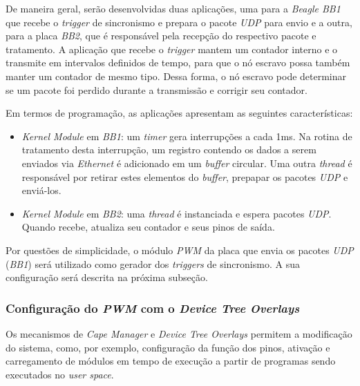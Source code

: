 De maneira geral, serão desenvolvidas duas aplicações, uma para a \textit{Beagle
BB1} que recebe o \textit{trigger} de sincronismo e prepara o pacote
\textit{UDP} para envio e a outra, para a placa \textit{BB2}, que é responsável
pela recepção do respectivo pacote e tratamento. A aplicação que recebe o
\textit{trigger} mantem um contador interno e o transmite em intervalos
definidos de tempo, para que o nó escravo possa também manter um contador
de mesmo tipo. Dessa forma, o nó escravo pode determinar se um pacote foi
perdido durante a transmissão e corrigir seu contador.

\vspace{12pt}

Em termos de programação, as aplicações apresentam as seguintes características:

\begin{itemize} \renewcommand\labelitemi{--}
  \item \textit{Kernel Module} em \textit{BB1}: um \textit{timer} gera
  interrupções a cada 1ms. Na rotina de tratamento desta interrupção, um
  registro contendo os dados a serem enviados via \textit{Ethernet} é
  adicionado em um \textit{buffer} circular. Uma outra \textit{thread}
  é responsável por retirar estes elementos do \textit{buffer}, prepapar os
  pacotes \textit{UDP} e enviá-los.

  \item \textit{Kernel Module} em \textit{BB2}: uma \textit{thread} é
  instanciada e espera pacotes \textit{UDP}. Quando recebe, atualiza seu
  contador e seus pinos de saída.
\end{itemize}

Por questões de simplicidade, o módulo \textit{PWM} da placa que envia os
pacotes \textit{UDP} (\textit{BB1}) será utilizado como gerador dos
\textit{triggers} de sincronismo. A sua configuração será descrita na próxima subseção.

\subsubsection {Configuração do \textit{PWM} com o \textit{Device Tree
Overlays}}

Os mecanismos de \textit{Cape Manager} e \textit{Device Tree Overlays} permitem
a modificação do sistema, como, por exemplo, configuração da função dos pinos,
ativação e carregamento de módulos em tempo de execução a partir de programas
sendo executados no \textit{user space}.

\vspace{12pt}


